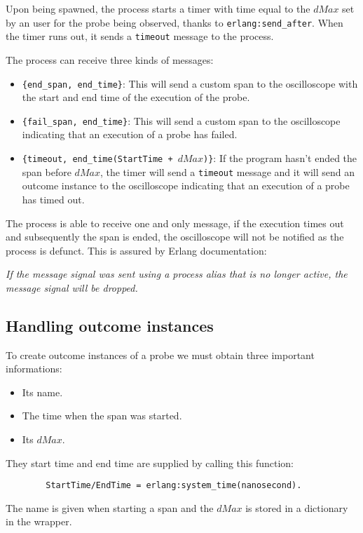             Upon being spawned, the process starts a timer with time equal to the $dMax$ set by an user for the probe being observed, thanks to \texttt{erlang:send\_after}. When the timer runs out, it sends a \texttt{timeout} message to the process.
        
        The process can receive three kinds of messages:
        \begin{itemize}
            \item \texttt{\{end\_span, end\_time\}}: This will send a custom span to the oscilloscope with the start and end time of the execution of the probe.
            \item \texttt{\{fail\_span, end\_time\}}: This will send a custom span to the oscilloscope indicating that an execution of a probe has failed.
            \item \texttt{\{timeout, end\_time(StartTime + $dMax$)\}}: If the program hasn't ended the span before $dMax$, the timer will send a \texttt{timeout} message and it will send an outcome instance to the oscilloscope indicating that an execution of a probe has timed out.
        \end{itemize}
        The process is able to receive one and only message, if the execution times out and subsequently the span is ended, the oscilloscope will not be notified as the process is defunct. This is assured by Erlang documentation:
        \begin{center}
            \textit{If the message signal was sent using a process alias that is no longer active, the message signal will be dropped.} \cite{erl-s}
        \end{center}

    \subsection{Handling outcome instances}
        To create outcome instances of a probe we must obtain three important informations:
        \begin{itemize}
            \item Its name.
            \item The time when the span was started.
            \item Its $dMax$.
        \end{itemize}
        
        They start time and end time are supplied by calling this function:
        \begin{verbatim}
        StartTime/EndTime = erlang:system_time(nanosecond).
        \end{verbatim}
        The name is given when starting a span and the $dMax$ is stored in a dictionary in the wrapper. 

